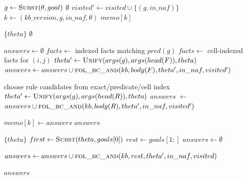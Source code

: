 \begin{algorithm}[H]
\caption{Goal Resolver - OR Node}
\begin{algorithmic}[1]
    \State $g \gets \Call{Subst}{\theta, goal}$
        \State \Return $\emptyset$ 
    \EndIf
    \State $visited' \gets visited \cup \{(g, in\_naf)\}$
    \State $k \gets (kb\_version, g, in\_naf, \theta)$
        \State \Return $memo[k]$
    \EndIf

     
            \State \Return $\{theta\}$ 
        \Else
            \State \Return $\emptyset$ 
        \EndIf
    \EndIf

    \State $answers \gets \emptyset$
    \State $facts \gets$ indexed facts matching $pred(g)$
        \State $facts \gets$ cell-indexed facts for $(i,j)$
    \EndIf
        \State $theta' \gets \Call{Unify}{args(g), args(head(F)), theta}$
            \State $answers \gets answers \cup \Call{fol\_bc\_and}{kb, body(F), theta', in\_naf, visited'}$
        \EndIf
    \EndFor

        \State choose rule candidates from exact/predicate/cell index
            \State $theta' \gets \Call{Unify}{args(g), args(head(R)), theta}$
                \State $answers$ $\gets$ $answers \cup \Call{fol\_bc\_and}{kb, body(R), theta', in\_naf, visited'}$
            \EndIf
        \EndFor
    \EndIf

    \State $memo[k] \gets answers$
    \State \Return $answers$
\EndFunction
\end{algorithmic}
\end{algorithm}

\begin{algorithm}[H]
\caption{Rule Body Validator - AND Node}
\begin{algorithmic}[1]
        \State \Return $\{theta\}$
    \EndIf
    \State $first \gets \Call{Subst}{theta, goals[0]}$
    \State $rest \gets goals[1:]$
    \State $answers \gets \emptyset$
    
        \State $answers \gets answers \cup \Call{fol\_bc\_and}{kb, rest, theta', in\_naf, visited}$
    \EndFor
    
    \State \Return $answers$
\EndFunction
\end{algorithmic}
\end{algorithm}

